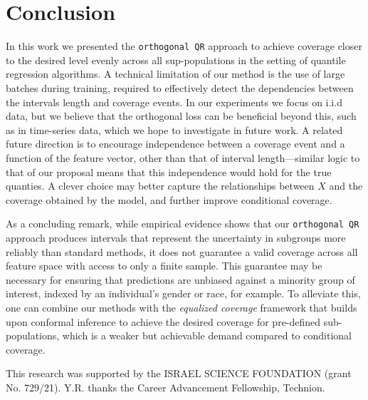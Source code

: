 \documentclass{article}
\begin{document}
\section{Conclusion}\label{sec:conclusion}

In this work we presented the \texttt{orthogonal QR} approach to achieve coverage closer to the desired level evenly across all sup-populations in the setting of quantile regression algorithms.
A technical limitation of our method is the use of large batches during training, required to effectively detect the dependencies between the intervals length and coverage events. In our experiments we focus on i.i.d data, but we believe that the orthogonal loss can be beneficial beyond this, such as in time-series data, which we hope to investigate in future work. A related future direction is to encourage independence between a coverage event and a function of the feature vector, other than that of interval length---similar logic to that of our proposal means that this independence would hold for the true quanties. A clever choice may better capture the relationships between $X$ and the coverage obtained by the model, and further improve conditional coverage.


As a concluding remark, while empirical evidence shows that our \texttt{orthogonal QR} approach produces intervals that represent the uncertainty in subgroups more reliably than standard methods, it does not guarantee a valid coverage across all feature space with access to only a finite sample. This guarantee may be necessary for ensuring that predictions are unbiased against a minority group of interest, indexed by an individual's gender or race, for example. To alleviate this, one can combine our methods with the \emph{equalized coverage} framework \cite{equalized_cov} that builds upon conformal inference to achieve the desired coverage for pre-defined sub-populations, which is a weaker but achievable demand compared to conditional coverage.


\begin{ack}
This research was supported by the ISRAEL SCIENCE FOUNDATION (grant No. 729/21). Y.R. thanks the Career Advancement Fellowship, Technion.

\end{ack}
\end{document}

